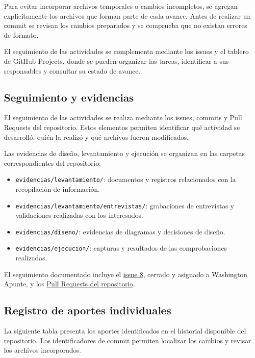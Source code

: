 Para evitar incorporar archivos temporales o cambios incompletos, se agregan explícitamente los archivos que forman parte de cada avance. Antes de realizar un commit se revisan los cambios preparados y se comprueba que no existan errores de formato.

El seguimiento de las actividades se complementa mediante los issues y el tablero de GitHub Projects, donde se pueden organizar las tareas, identificar a sus responsables y consultar su estado de avance.

\subsection{Seguimiento y evidencias}

El seguimiento de las actividades se realiza mediante los issues, commits y Pull Requests del repositorio. Estos elementos permiten identificar qué actividad se desarrolló, quién la realizó y qué archivos fueron modificados.

Las evidencias de diseño, levantamiento y ejecución se organizan en las carpetas correspondientes del repositorio:

\begin{itemize}
    \item \texttt{evidencias/levantamiento/}: documentos y registros relacionados con la recopilación de información.
    \item \texttt{evidencias/levantamiento/entrevistas/}: grabaciones de entrevistas y validaciones realizadas con los interesados.
    \item \texttt{evidencias/diseno/}: evidencias de diagramas y decisiones de diseño.
    \item \texttt{evidencias/ejecucion/}: capturas y resultados de las comprobaciones realizadas.
\end{itemize}

El seguimiento documentado incluye el \href{https://github.com/SteffannyLoorSuarez1/TA-PFC-E1-Proyecto-Fin-de-Curso/issues/8}{issue 8}, cerrado y asignado a Washington Apunte, y los \href{https://github.com/SteffannyLoorSuarez1/TA-PFC-E1-Proyecto-Fin-de-Curso/pulls}{Pull Requests del repositorio}.

\subsection{Registro de aportes individuales}

La siguiente tabla presenta los aportes identificados en el historial disponible del repositorio. Los identificadores de commit permiten localizar los cambios y revisar los archivos incorporados.

